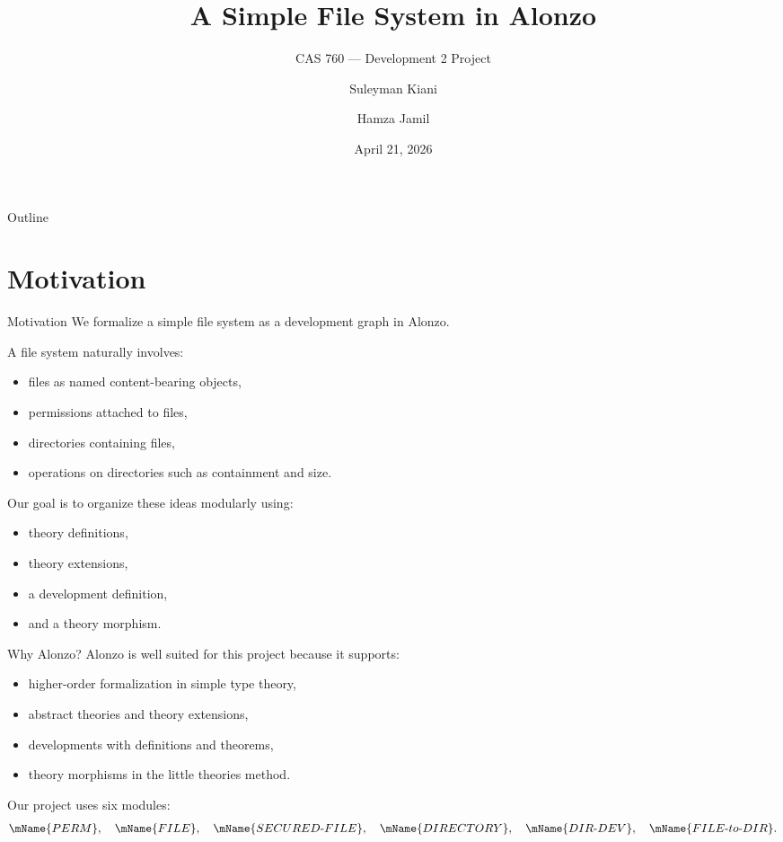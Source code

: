 \documentclass[aspectratio=169]{beamer}
\title{A Simple File System in Alonzo}
\subtitle{CAS 760 --- Development 2 Project}
\author{Suleyman Kiani \and Hamza Jamil}
\institute{McMaster University}
\date{April 21, 2026}
\newcommand{\PERM}{\mName{PERM}}
\newcommand{\FILETYPE}{\mName{FILE}}
\newcommand{\SECFILE}{\mName{SECURED\text{-}FILE}}
\newcommand{\DIR}{\mName{DIRECTORY}}
\newcommand{\DIRDEV}{\mName{DIR\text{-}DEV}}
\begin{document}
\begin{frame}
\titlepage
\end{frame}

\begin{frame}{Outline}
\tableofcontents
\end{frame}

\section{Motivation}

\begin{frame}{Motivation}
We formalize a simple file system as a development graph in Alonzo.

\medskip
A file system naturally involves:
\begin{itemize}
  \item files as named content-bearing objects,
  \item permissions attached to files,
  \item directories containing files,
  \item operations on directories such as containment and size.
\end{itemize}

\medskip
Our goal is to organize these ideas modularly using:
\begin{itemize}
  \item theory definitions,
  \item theory extensions,
  \item a development definition,
  \item and a theory morphism.
\end{itemize}
\end{frame}

\begin{frame}{Why Alonzo?}
Alonzo is well suited for this project because it supports:
\begin{itemize}
  \item higher-order formalization in simple type theory,
  \item abstract theories and theory extensions,
  \item developments with definitions and theorems,
  \item theory morphisms in the little theories method.
\end{itemize}

\medskip
Our project uses six modules:
\[
\PERM,\quad \FILETYPE,\quad \SECFILE,\quad \DIR,\quad \DIRDEV,
\quad \mName{FILE\text{-}to\text{-}DIR}.
\]
\end{frame}
\end{document}
